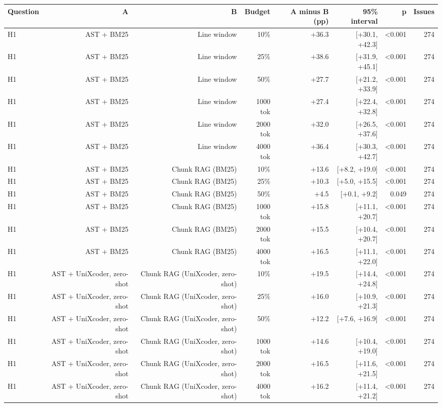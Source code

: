 \begin{tabular}{lrrrrrrr}
\toprule
Question & A & B & Budget & A minus B (pp) & 95\% interval & p & Issues \\
\midrule
H1 & AST + BM25 & Line window & 10\% & +36.3 & [+30.1, +42.3] & <0.001 & 274 \\
H1 & AST + BM25 & Line window & 25\% & +38.6 & [+31.9, +45.1] & <0.001 & 274 \\
H1 & AST + BM25 & Line window & 50\% & +27.7 & [+21.2, +33.9] & <0.001 & 274 \\
H1 & AST + BM25 & Line window & 1000 tok & +27.4 & [+22.4, +32.8] & <0.001 & 274 \\
H1 & AST + BM25 & Line window & 2000 tok & +32.0 & [+26.5, +37.6] & <0.001 & 274 \\
H1 & AST + BM25 & Line window & 4000 tok & +36.4 & [+30.3, +42.7] & <0.001 & 274 \\
H1 & AST + BM25 & Chunk RAG (BM25) & 10\% & +13.6 & [+8.2, +19.0] & <0.001 & 274 \\
H1 & AST + BM25 & Chunk RAG (BM25) & 25\% & +10.3 & [+5.0, +15.5] & <0.001 & 274 \\
H1 & AST + BM25 & Chunk RAG (BM25) & 50\% & +4.5 & [+0.1, +9.2] & 0.049 & 274 \\
H1 & AST + BM25 & Chunk RAG (BM25) & 1000 tok & +15.8 & [+11.1, +20.7] & <0.001 & 274 \\
H1 & AST + BM25 & Chunk RAG (BM25) & 2000 tok & +15.5 & [+10.4, +20.7] & <0.001 & 274 \\
H1 & AST + BM25 & Chunk RAG (BM25) & 4000 tok & +16.5 & [+11.1, +22.0] & <0.001 & 274 \\
H1 & AST + UniXcoder, zero-shot & Chunk RAG (UniXcoder, zero-shot) & 10\% & +19.5 & [+14.4, +24.8] & <0.001 & 274 \\
H1 & AST + UniXcoder, zero-shot & Chunk RAG (UniXcoder, zero-shot) & 25\% & +16.0 & [+10.9, +21.3] & <0.001 & 274 \\
H1 & AST + UniXcoder, zero-shot & Chunk RAG (UniXcoder, zero-shot) & 50\% & +12.2 & [+7.6, +16.9] & <0.001 & 274 \\
H1 & AST + UniXcoder, zero-shot & Chunk RAG (UniXcoder, zero-shot) & 1000 tok & +14.6 & [+10.4, +19.0] & <0.001 & 274 \\
H1 & AST + UniXcoder, zero-shot & Chunk RAG (UniXcoder, zero-shot) & 2000 tok & +16.5 & [+11.6, +21.5] & <0.001 & 274 \\
H1 & AST + UniXcoder, zero-shot & Chunk RAG (UniXcoder, zero-shot) & 4000 tok & +16.2 & [+11.4, +21.2] & <0.001 & 274 \\

\end{tabular}
